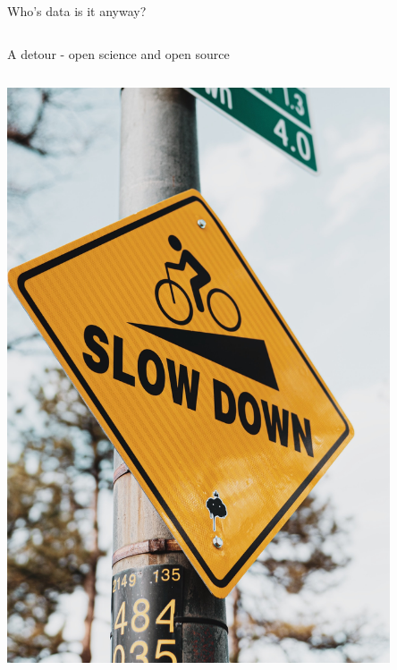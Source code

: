 \begin{frame}{Who's data is it anyway?}
\begin{columns}[c]
\end{columns}

\end{frame}

\begin{frame}{A detour - open science and open source}

\begin{columns}[c]
    \begin{column}{0.35\textwidth}
        
        \includegraphics[width=0.85\textwidth]{images/logan-weaver-PJYOpJCcbRg-unsplash.jpg}
        
        

    \end{column}
    

\end{columns}
\end{frame}

